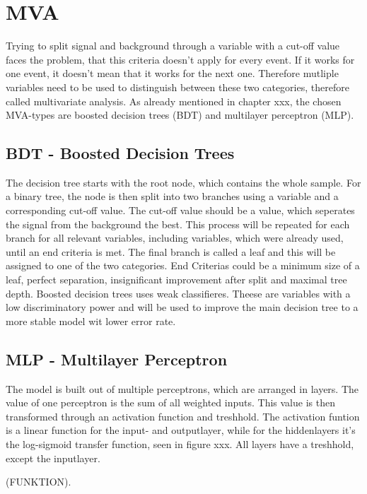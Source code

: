 \documentclass[11pt]{scrartcl}
\begin{document}
\section{MVA}

Trying to split signal and background through a variable with a cut-off value faces the problem, that this criteria doesn't apply for every event. If it works for one event, it doesn't mean that it works for the next one. Therefore mutliple variables need to be used to distinguish between these two categories, therefore called multivariate analysis. As already mentioned in chapter xxx, the chosen MVA-types are boosted decision trees (BDT) and multilayer perceptron (MLP).

	\subsection{BDT - Boosted Decision Trees}
	The decision tree starts with the root node, which contains the whole sample. For a binary tree, the node is then split into two branches using a variable and a corresponding cut-off value. The cut-off value should be a value, which seperates the signal from the background the best. This process will be repeated for each branch for all relevant variables, including variables, which were already used, until an end criteria is met. The final branch is called a leaf and this will be assigned to one of the two categories. End Criterias could be a minimum size of a leaf, perfect separation, insignificant improvement after split and maximal tree depth. Boosted decision trees uses weak classifieres. Theese are variables with a low discriminatory power and will be used to improve the main decision tree to a more stable model wit lower error rate. 
	
	\subsection{MLP - Multilayer Perceptron}
	
	The model is built out of multiple perceptrons, which are arranged in layers. The value of one perceptron is the sum of all weighted inputs. This value is then transformed through an activation function and treshhold. The activation funtion is a linear function for the input- and outputlayer, while for the hiddenlayers it's the log-sigmoid transfer function, seen in figure xxx. All layers have a treshhold, except the inputlayer. 
	
	(FUNKTION).
	
\end{document}
